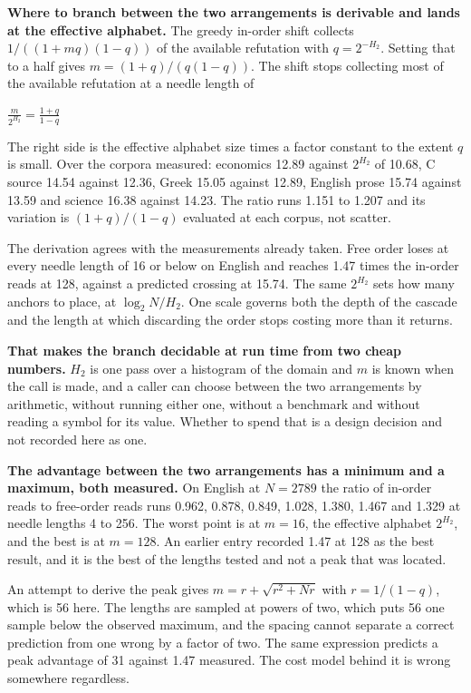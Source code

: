 \textbf{Where to branch between the two arrangements is derivable and lands at the effective alphabet.} The greedy in-order shift collects \(1/((1+mq)(1-q))\) of the available refutation with \(q = 2^{-H_2}\). Setting that to a half gives \(m = (1+q)/(q(1-q))\). The shift stops collecting most of the available refutation at a needle length of

\(\frac{m}{2^{H_2}} = \frac{1+q}{1-q}\)

The right side is the effective alphabet size times a factor constant to the extent \(q\) is small. Over the corpora measured: economics 12.89 against \(2^{H_2}\) of 10.68, C source 14.54 against 12.36, Greek 15.05 against 12.89, English prose 15.74 against 13.59 and science 16.38 against 14.23. The ratio runs 1.151 to 1.207 and its variation is \((1+q)/(1-q)\) evaluated at each corpus, not scatter.

The derivation agrees with the measurements already taken. Free order loses at every needle length of 16 or below on English and reaches 1.47 times the in-order reads at 128, against a predicted crossing at 15.74. The same \(2^{H_2}\) sets how many anchors to place, at \(\log_2 N / H_2\). One scale governs both the depth of the cascade and the length at which discarding the order stops costing more than it returns.

\textbf{That makes the branch decidable at run time from two cheap numbers.} \(H_2\) is one pass over a histogram of the domain and \(m\) is known when the call is made, and a caller can choose between the two arrangements by arithmetic, without running either one, without a benchmark and without reading a symbol for its value. Whether to spend that is a design decision and not recorded here as one.

\textbf{The advantage between the two arrangements has a minimum and a maximum, both measured.} On English at \(N = 2789\) the ratio of in-order reads to free-order reads runs 0.962, 0.878, 0.849, 1.028, 1.380, 1.467 and 1.329 at needle lengths 4 to 256. The worst point is at \(m = 16\), the effective alphabet \(2^{H_2}\), and the best is at \(m = 128\). An earlier entry recorded 1.47 at 128 as the best result, and it is the best of the lengths tested and not a peak that was located.

An attempt to derive the peak gives \(m = r + \sqrt{r^2 + Nr}\) with \(r = 1/(1-q)\), which is 56 here. The lengths are sampled at powers of two, which puts 56 one sample below the observed maximum, and the spacing cannot separate a correct prediction from one wrong by a factor of two. The same expression predicts a peak advantage of 31 against 1.47 measured. The cost model behind it is wrong somewhere regardless.

